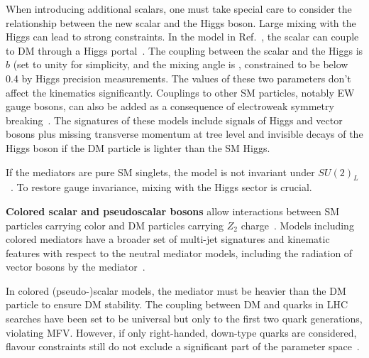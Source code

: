 When introducing additional scalars, one must take special care to consider the relationship between the new scalar and the Higgs boson. Large mixing with the Higgs can lead to strong constraints. In the model in Ref.~\cite{Berlin:2014cfa}, the scalar can couple to DM through a Higgs portal~\cite{Berlin:2014cfa}. The coupling between the scalar and the Higgs is $b$ (set to unity for simplicity, and the mixing angle is \sinthetahS, constrained to be below 0.4 by Higgs precision measurements. The values of these two parameters don't affect the kinematics significantly. 
Couplings to other SM particles, notably EW gauge bosons, can also be added as a consequence of electroweak symmetry breaking~\cite{Bauer:2016gys,Englert:2016joy}. The signatures of these models include signals of Higgs and vector bosons plus missing transverse momentum at tree level and invisible decays of the Higgs boson if the DM particle is lighter than the SM Higgs.

If the mediators are pure SM singlets, the model is not invariant under $SU(2)_L$~\cite{Bell:2016ekl}. 
To restore gauge invariance, mixing with the Higgs sector is crucial. 

\textbf{Colored scalar and pseudoscalar bosons} allow interactions between SM particles carrying color and DM particles carrying $Z_2$ charge~\cite{Bai:2013iqa, Papucci:2014iwa, An:2013xka, Bell:2012rg}. Models including colored mediators have a broader set of multi-jet signatures and kinematic features with respect to the neutral mediator models, including the radiation of vector bosons by the mediator~\cite{Bell:2012rg}. 

In colored (pseudo-)scalar models, the mediator must be heavier than the DM particle to ensure DM stability. 
The coupling between DM and quarks \gdmq in LHC searches have been set to be universal but only to the first two quark generations, violating MFV. However, if only right-handed, down-type quarks are considered, flavour constraints still do not exclude a significant part of the parameter space~\cite{Abercrombie:2015wmb}. 

